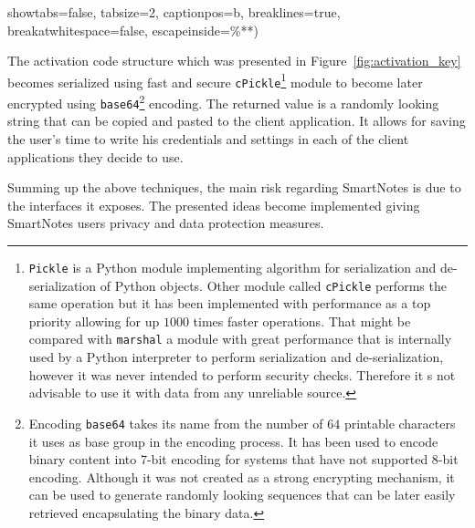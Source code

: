 \begin{itemize}
{{showtabs=false,                 %
tabsize=2,                    %
captionpos=b,                   %
breaklines=true,                %
breakatwhitespace=false,        %
escapeinside={\%*}{*)}          %
}

The activation code structure which was presented in Figure~\ref{fig:activation_key} becomes serialized using fast and secure \texttt{cPickle}\footnote{\texttt{Pickle} is a Python module implementing algorithm for serialization and de-serialization of Python objects. Other module called \texttt{cPickle} performs the same operation but it has been implemented with performance as a top priority allowing for up $1000$ times faster operations. That might be compared with \texttt{marshal} a module with great performance that is internally used by a Python interpreter to perform serialization and de-serialization, however it was never intended to perform security checks. Therefore it s not advisable to use it with data from any unreliable source.} module to become later encrypted using \texttt{base64}\footnote{Encoding \texttt{base64} takes its name from the number of $64$ printable characters it uses as base group in the encoding process. It has been used to encode binary content into 7-bit encoding for systems that have not supported 8-bit encoding. Although it was not created as a strong encrypting mechanism, it can be used to generate randomly looking sequences that can be later easily retrieved encapsulating the binary data.} encoding. The returned value is a randomly looking string that can be copied and pasted to the client application. It allows for saving the user’s time to write his credentials and settings in each of the client applications they decide to use.}
\end{itemize}
 
Summing up the above techniques, the main risk regarding SmartNotes is due to the interfaces it exposes. The presented ideas become implemented giving SmartNotes users privacy and data protection measures.
